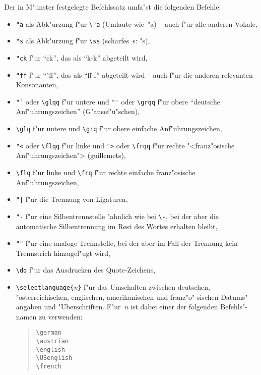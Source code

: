 Der in M"unster festgelegte Befehlssatz umfa"st die folgenden Befehle:
\begin{itemize}

\item
\verb|"a| als Abk"urzung f"ur \verb|\"a| (Umlaute wie~"a)
-- auch f"ur alle anderen Vokale,

\item
\verb|"s| als Abk"urzung f"ur \verb|\ss| (scharfes~s: "s),

\item
\verb|"ck|  f"ur "`ck"', das als "`k-k"' abgeteilt wird,

\item
\verb|"ff| f"ur "`"ff"', das als "`ff-f"' abgeteilt wird
-- auch f"ur die anderen relevanten Konsonanten,

\item
\verb|"`| oder \verb|\glqq| f"ur untere und
\verb|"'| oder \verb|\grqq| f"ur obere "`deutsche Anf"uhrungszeichen"'
(\glqq G"ansef"u"schen\grqq),

\item
\verb|\glq| f"ur untere und \verb|\grq| f"ur obere
\glq einfache Anf"uhrungszeichen\grq ,

\item
\verb|"<| oder \verb|\flqq| f"ur linke und
\verb|">| oder \verb|\frqq| f"ur rechte "<franz"osische
Anf"uh\-rungs\-zei\-chen">
(\flqq guillemets\frqq),

\item
\verb|\flq| f"ur linke und
\verb|\frq| f"ur rechte \flq einfache franz"osische
Anf"uh\-rungs\-zei\-chen\frq,

\item
\verb."|. f"ur die Trennung von Ligaturen,

\item
\verb|"-| f"ur eine Silbentrennstelle "ahnlich wie bei \verb|\-|,
bei der aber die automatische Silbentrennung im Rest des Wortes
erhalten bleibt,

\item
\verb|""| f"ur eine analoge Trennstelle, bei der aber im Fall der Trennung
kein Trennstrich hinzugef"ugt wird,     %

\item
\verb|\dq| f"ur das Ausdrucken des Quote-Zeichens,

\goodbreak
\item
\verb|\selectlanguage{|{\it n\/}\verb|}|
f"ur das Umschalten zwischen
deutschen, "osterreichischen, englischen, amerikanischen und franz"o"-sischen
Datums"-angaben und "Uberschriften.
F"ur~{\it n\/} ist dabei einer der folgenden Befehls"-namen zu verwenden:
\begin{quote}
\verb|\german|   \\
\verb|\austrian| \\
\verb|\english|  \\
\verb|\USenglish| \\
\verb|\french|
\end{quote}


\end{itemize}
